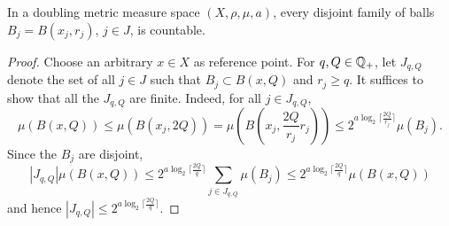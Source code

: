 \begin{lemma}
    \label{disjoint-family-countable}
    In a doubling metric measure space $(X,\rho,\mu, a)$, every disjoint family of balls $B_j = B(x_j, r_j)$, $j\in J$, is countable.
\end{lemma}
\begin{proof}
    Choose an arbitrary $x\in X$ as reference point. For $q, Q\in{\mathbb{Q}}_+$, let $J_{q,Q}$ denote the set of all $j\in J$ such that $B_j\subset B(x, Q)$ and $r_j \ge q$. It suffices to show that all the $J_{q,Q}$ are finite.
    Indeed, for all $j\in J_{q,Q}$,
    \begin{equation*}
        \mu(B(x, Q)) \le \mu(B(x_j, 2Q)) = \mu(B(x_j, \frac{2 Q}{r_j} r_j))
        \le 2^{a\log_2{\lceil \frac{2 Q}{r_j}\rceil}} \mu(B_j).
    \end{equation*}
    Since the $B_j$ are disjoint,
    \begin{equation}
        |J_{q,Q}| \mu(B(x, Q)) \le 2^{a\log_2{\lceil\frac{2Q}{q}\rceil}} \sum_{j\in J_{q,Q}} \mu(B_j) \le 2^{a\log_2{\lceil\frac{2Q}{q}\rceil}} \mu(B(x,Q))
    \end{equation}
    and hence $|J_{q,Q}| \le 2^{a\log_2{\lceil\frac{2Q}{q}\rceil}}$.
\end{proof}


